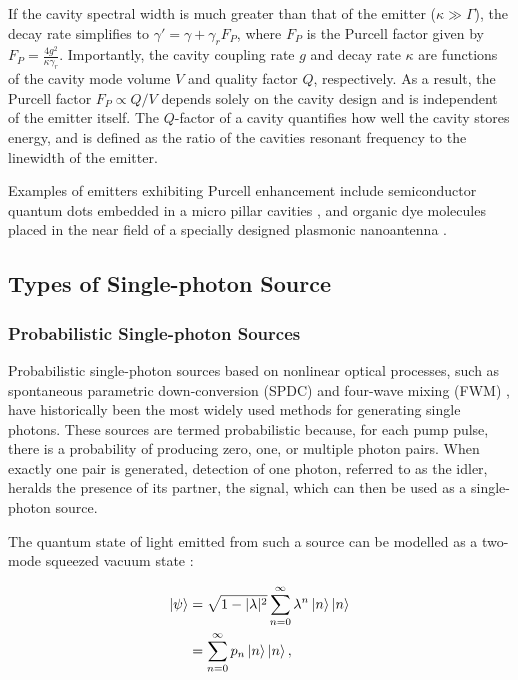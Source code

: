 If the cavity spectral width is much greater than that of the emitter ($\kappa \gg \Gamma$), the decay rate simplifies to $\gamma' = \gamma + \gamma_r F_P$, where $F_P$ is the Purcell factor given by $F_P = \frac{4g^2}{\kappa \gamma_r}$. Importantly, the cavity coupling rate $g$ and decay rate $\kappa$ are functions of the cavity mode volume $V$ and quality factor $Q$, respectively. As a result, the Purcell factor $F_P \propto Q/V$ depends solely on the cavity design and is independent of the emitter itself. The $Q$-factor of a cavity quantifies how well the cavity stores energy, and is defined as the ratio of the cavities resonant frequency to the linewidth of the emitter.

Examples of emitters exhibiting Purcell enhancement include semiconductor quantum dots embedded in a micro pillar cavities \cite{Engel2023}, and organic dye molecules placed in the near field of a specially designed plasmonic nanoantenna \cite{Zhao2020}. 

\subsection{Types of Single-photon Source}

\subsubsection{Probabilistic Single-photon Sources}

Probabilistic single-photon sources based on nonlinear optical processes, such as spontaneous parametric down-conversion (SPDC) and four-wave mixing (FWM) \cite{Chopin2023}, have historically been the most widely used methods for generating single photons. These sources are termed probabilistic because, for each pump pulse, there is a probability of producing zero, one, or multiple photon pairs. When exactly one pair is generated, detection of one photon, referred to as the idler, heralds the presence of its partner, the signal, which can then be used as a single-photon source.

The quantum state of light emitted from such a source can be modelled as a two-mode squeezed vacuum state \cite{Braunstein2005}:

\begin{equation}
\begin{aligned}
    |\psi\rangle &= \sqrt{1 - |\lambda|^2} \sum_{n=0}^{\infty} \lambda^n  \ket{n}\ket{n} \\
    &= \sum_{n=0}^{\infty} p_n \ket{n}\ket{n},
    \label{eqn:squeezed_state_model}
\end{aligned}
\end{equation}

